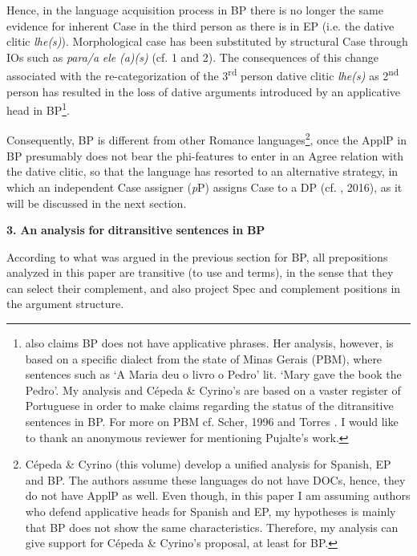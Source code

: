 \documentclass[output=paper,modfonts,nonflat]{langsci/langscibook}
\begin{document}
Hence, in the language acquisition process in BP there is no longer the same evidence for inherent Case in the third person as there is in EP (i.e. the dative clitic \textit{lhe(s)}). Morphological case has been substituted by structural Case through IOs such as \textit{para/a} \textit{ele} \textit{(a)(s)} (cf. 1 and 2). The consequences of this change associated with the re-categorization of the 3\textsuperscript{rd} person dative clitic \textit{lhe(s)} as 2\textsuperscript{nd} person has resulted in the loss of dative arguments introduced by an applicative head in BP\footnote{\textrm{\citet{Pujalte2010} also claims BP does not have applicative phrases. Her analysis, however, is based on a specific dialect from the state of Minas Gerais (PBM), where sentences such as ‘A Maria deu o livro o Pedro’ lit. ‘Mary gave the book the Pedro’. My analysis and Cépeda \& Cyrino’s are based on a vaster register of Portuguese in order to make claims regarding the status of the ditransitive sentences in BP. For more on PBM cf. Scher, 1996 and Torres \citet{MoraisSalles2010}. I would like to thank an anonymous reviewer for mentioning Pujalte’s work.}}. 

Consequently, BP is different from other Romance languages\footnote{ \textrm{Cépeda \& Cyrino (this volume) develop a unified analysis for Spanish, EP and BP. The authors assume these languages do not have DOCs, hence, they do not have ApplP as well. Even though, in this paper I am assuming authors who defend applicative heads for Spanish and EP, my hypotheses is mainly that BP does not show the same characteristics. Therefore, my analysis can give support for Cépeda \& Cyrino’s proposal, at least for BP.}}, once the ApplP in BP presumably does not bear the phi-features to enter in an Agree relation with the dative clitic, so that the language has resorted to an alternative strategy, in which an independent Case assigner (\textit{p}P) assigns Case to a DP (cf. \citealt{Calindro2015}, 2016), as it will be discussed in the next section. 

\textbf{3.} \textbf{An} \textbf{analysis} \textbf{for} \textbf{ditransitive} \textbf{sentences} \textbf{in} \textbf{BP}  

\begin{styleBodyTextii}
According to what was argued in the previous section for BP, all prepositions analyzed in this paper are transitive (to use \citealt{Svenonius2004} and \citealt{Cuervo2010} terms), in the sense that they can select their complement, and also project Spec and complement positions in the argument structure.
\end{styleBodyTextii}
\end{document}
